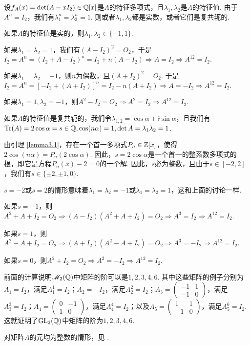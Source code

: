 \begin{solution}
  设$f_A(x)=\det(A-xI_2)\in\mathbb Q[x]$是$A$的特征多项式，且$\lambda_1,\lambda_2$是$A$的特征值. 由于$A^n=I_2$，我们有$\lambda_1^n=\lambda_2^n=1$. 则或者$\lambda_1,\lambda_2$都是实数，或者它们是复共轭的.

  如果$A$的特征值是实的，则$\lambda_1,\lambda_2\in\{-1,1\}$.

  如果$\lambda_1=\lambda_2=1$，我们有$(A-I_2)^2=O_2$，于是$I_2=A^n=(I_2+A-I_2)^n
  =I_2+n(A-I_2)\Rightarrow A=I_2\Rightarrow A^{12}=I_2$.

  如果$\lambda_1=\lambda_2=-1$，则$n$为偶数，且$(A+I_2)^2=O_2$. 于是$I_2=A^n=[-I_2+(A+I_2)]^n=I_2-n(A+I_2)\Rightarrow A=-I_2
  \Rightarrow A^{12}=I_2$.

  如果$\lambda_1=1,\lambda_2=-1$，则$A^2-I_2=O_2\Rightarrow
  A^2=I_2\Rightarrow A^{12}=I_2$.

  如果$A$的特征值是复共轭的，我们令$\lambda_{1,2}=\cos\alpha\pm\ii\sin\alpha$，且我们有$\operatorname{Tr}(A)=2\cos\alpha=s\in\mathbb Q,\cos(n\alpha)=1,\det A=\lambda_1\lambda_2=1$.

  由引理 \ref{lemma3.1}，存在一个首一多项式$P_n\in\mathbb Z[x]$，使得$2\cos(n\alpha)=P_n(2\cos \alpha)$. 因此，$s=2\cos\alpha$是一个首一的整系数多项式的根，即它是方程$P_n(x)-2=0$的一个解. 因此，$s$必为整数，且由于$s\in[-2,2]$，我们有$s\in\{\pm2,\pm1,0\}$.

  $s=-2$或$s=2$的情形意味着$\lambda_1=\lambda_2=-1$或$\lambda_1=\lambda_2=1$，这和上面的讨论一样.

  如果$s=-1$，则$A^2+A+I_2=O_2\Rightarrow(A-I_2)(A^2+A+I_2)=O_2\Rightarrow A^3=I_2\Rightarrow A^{12}=I_2$.

  如果$s=1$，则$A^2-A+I_2=O_2\Rightarrow(A+I_2)(A^2-A+I_2)=O_2\Rightarrow A^3=-I_2\Rightarrow A^{12}=I_2$.

  如果$s=0$，则$A^2+I_2=O_2\Rightarrow A^2=-I_2\Rightarrow A^{12}=I_2$.

  前面的计算说明$\mathscr M_2(\mathbb Q)$中矩阵的阶可以是$1,2,3,4,6$. 其中这些矩阵的例子分别为$A_1=I_2$，满足$A_1^1=I_2$；$A_2=-I_2$，满足$A_2^2=I_2$；$A_3=\begin{pmatrix}
    -1 & 1 \\
    -1 & 0
  \end{pmatrix}$，满足$A_3^3=I_2$；$A_4=\begin{pmatrix}
    0 & -1 \\
    1 & 0
  \end{pmatrix}$，满足$A_4^4=I_2$；以及$A_5=\begin{pmatrix}
    1 & 1 \\
    -1 & 0
  \end{pmatrix}$，满足$A_5^6=I_2$. 这就证明了$\operatorname{GL}_2(\mathbb Q)$中矩阵的阶为$1,2,3,4,6$.

  对矩阵$A$的元均为整数的情形，见 \cite[Problem 7.7.7, p.145]{58}.
\end{solution}

